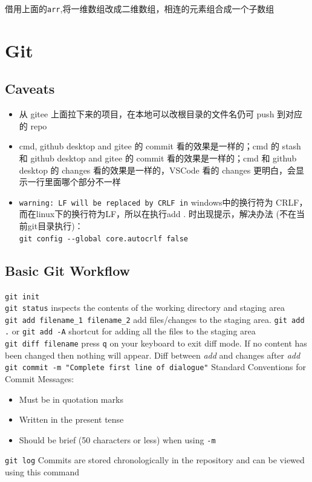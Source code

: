 \documentclass[a4paper, 12pt]{article}
\begin{document}
借用上面的\verb|arr|,将一维数组改成二维数组，相连的元素组合成一个子数组

\section{Git}

\subsection{Caveats}
\begin{itemize}

\item 从 gitee 上面拉下来的项目，在本地可以改根目录的文件名仍可 push 到对应的 repo

\item cmd, github desktop and gitee 的 commit 看的效果是一样的；cmd 的 stash 和 github desktop and gitee 的 commit 看的效果是一样的；cmd 和 github desktop 的 changes 看的效果是一样的，VSCode 看的 changes 更明白，会显示一行里面哪个部分不一样

\item \verb|warning: LF will be replaced by CRLF in| windows中的换行符为 CRLF， 而在linux下的换行符为LF，所以在执行add . 时出现提示，解决办法 (不在当前git目录执行)：\\
\verb|git config --global core.autocrlf false|
\end{itemize}

\subsection{Basic Git Workflow}
\noindent\verb|git init|\\
\verb|git status| inspects the contents of the working directory and staging area\\
\verb|git add filename_1 filename_2| add files/changes to the staging area. \verb|git add .| or \verb|git add -A| shortcut for adding all the files to the staging area \\
\verb|git diff filename| press \verb|q| on your keyboard to exit diff mode. If no content has been changed then nothing will appear. Diff between \textit{add} and changes after \textit{add} \\ 
\verb|git commit -m "Complete first line of dialogue"| Standard Conventions for Commit Messages:
\begin{itemize}
\item Must be in quotation marks
\item Written in the present tense
\item Should be brief (50 characters or less) when using \verb|-m|
\end{itemize}
\verb|git log| Commits are stored chronologically in the repository and can be viewed using this command
\end{document}
